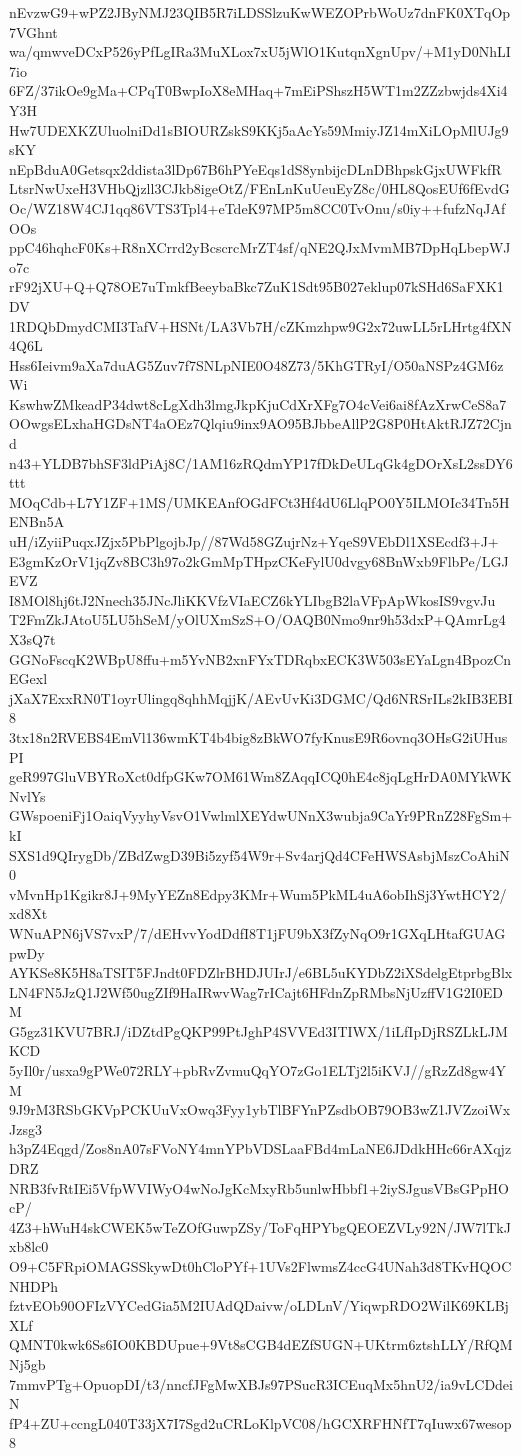 nEvzwG9+wPZ2JByNMJ23QIB5R7iLDSSlzuKwWEZOPrbWoUz7dnFK0XTqOp7VGhnt
wa/qmwveDCxP526yPfLgIRa3MuXLox7xU5jWlO1KutqnXgnUpv/+M1yD0NhLI7io
6FZ/37ikOe9gMa+CPqT0BwpIoX8eMHaq+7mEiPShszH5WT1m2ZZzbwjds4Xi4Y3H
Hw7UDEXKZUluolniDd1sBIOURZskS9KKj5aAcYs59MmiyJZ14mXiLOpMlUJg9sKY
nEpBduA0Getsqx2ddista3lDp67B6hPYeEqs1dS8ynbijcDLnDBhpskGjxUWFkfR
LtsrNwUxeH3VHbQjzll3CJkb8igeOtZ/FEnLnKuUeuEyZ8c/0HL8QosEUf6fEvdG
Oc/WZ18W4CJ1qq86VTS3Tpl4+eTdeK97MP5m8CC0TvOnu/s0iy++fufzNqJAfOOs
ppC46hqhcF0Ks+R8nXCrrd2yBcscrcMrZT4sf/qNE2QJxMvmMB7DpHqLbepWJo7c
rF92jXU+Q+Q78OE7uTmkfBeeybaBkc7ZuK1Sdt95B027eklup07kSHd6SaFXK1DV
1RDQbDmydCMI3TafV+HSNt/LA3Vb7H/cZKmzhpw9G2x72uwLL5rLHrtg4fXN4Q6L
Hss6Ieivm9aXa7duAG5Zuv7f7SNLpNIE0O48Z73/5KhGTRyI/O50aNSPz4GM6zWi
KswhwZMkeadP34dwt8cLgXdh3lmgJkpKjuCdXrXFg7O4cVei6ai8fAzXrwCeS8a7
OOwgsELxhaHGDsNT4aOEz7Qlqiu9inx9AO95BJbbeAllP2G8P0HtAktRJZ72Cjnd
n43+YLDB7bhSF3ldPiAj8C/1AM16zRQdmYP17fDkDeULqGk4gDOrXsL2ssDY6ttt
MOqCdb+L7Y1ZF+1MS/UMKEAnfOGdFCt3Hf4dU6LlqPO0Y5ILMOIc34Tn5HENBn5A
uH/iZyiiPuqxJZjx5PbPlgojbJp//87Wd58GZujrNz+YqeS9VEbDl1XSEcdf3+J+
E3gmKzOrV1jqZv8BC3h97o2kGmMpTHpzCKeFylU0dvgy68BnWxb9FlbPe/LGJEVZ
I8MOl8hj6tJ2Nnech35JNcJliKKVfzVIaECZ6kYLIbgB2laVFpApWkosIS9vgvJu
T2FmZkJAtoU5LU5hSeM/yOlUXmSzS+O/OAQB0Nmo9nr9h53dxP+QAmrLg4X3sQ7t
GGNoFscqK2WBpU8ffu+m5YvNB2xnFYxTDRqbxECK3W503sEYaLgn4BpozCnEGexl
jXaX7ExxRN0T1oyrUlingq8qhhMqjjK/AEvUvKi3DGMC/Qd6NRSrILs2kIB3EBI8
3tx18n2RVEBS4EmVl136wmKT4b4big8zBkWO7fyKnusE9R6ovnq3OHsG2iUHusPI
geR997GluVBYRoXct0dfpGKw7OM61Wm8ZAqqICQ0hE4c8jqLgHrDA0MYkWKNvlYs
GWspoeniFj1OaiqVyyhyVsvO1VwlmlXEYdwUNnX3wubja9CaYr9PRnZ28FgSm+kI
SXS1d9QIrygDb/ZBdZwgD39Bi5zyf54W9r+Sv4arjQd4CFeHWSAsbjMszCoAhiN0
vMvnHp1Kgikr8J+9MyYEZn8Edpy3KMr+Wum5PkML4uA6obIhSj3YwtHCY2/xd8Xt
WNuAPN6jVS7vxP/7/dEHvvYodDdfI8T1jFU9bX3fZyNqO9r1GXqLHtafGUAGpwDy
AYKSe8K5H8aTSIT5FJndt0FDZlrBHDJUIrJ/e6BL5uKYDbZ2iXSdelgEtprbgBlx
LN4FN5JzQ1J2Wf50ugZIf9HaIRwvWag7rICajt6HFdnZpRMbsNjUzffV1G2I0EDM
G5gz31KVU7BRJ/iDZtdPgQKP99PtJghP4SVVEd3ITIWX/1iLfIpDjRSZLkLJMKCD
5yIl0r/usxa9gPWe072RLY+pbRvZvmuQqYO7zGo1ELTj2l5iKVJ//gRzZd8gw4YM
9J9rM3RSbGKVpPCKUuVxOwq3Fyy1ybTlBFYnPZsdbOB79OB3wZ1JVZzoiWxJzsg3
h3pZ4Eqgd/Zos8nA07sFVoNY4mnYPbVDSLaaFBd4mLaNE6JDdkHHc66rAXqjzDRZ
NRB3fvRtIEi5VfpWVIWyO4wNoJgKcMxyRb5unlwHbbf1+2iySJgusVBsGPpHOcP/
4Z3+hWuH4skCWEK5wTeZOfGuwpZSy/ToFqHPYbgQEOEZVLy92N/JW7lTkJxb8lc0
O9+C5FRpiOMAGSSkywDt0hCloPYf+1UVs2FlwmsZ4ccG4UNah3d8TKvHQOCNHDPh
fztvEOb90OFIzVYCedGia5M2IUAdQDaivw/oLDLnV/YiqwpRDO2WilK69KLBjXLf
QMNT0kwk6Ss6IO0KBDUpue+9Vt8sCGB4dEZfSUGN+UKtrm6ztshLLY/RfQMNj5gb
7mmvPTg+OpuopDI/t3/nncfJFgMwXBJs97PSucR3ICEuqMx5hnU2/ia9vLCDdeiN
fP4+ZU+ccngL040T33jX7I7Sgd2uCRLoKlpVC08/hGCXRFHNfT7qIuwx67wesop8
